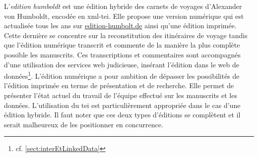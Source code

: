 \documentclass[a4paper, 12pt, twoside]{book}
\begin{document}
L'\textit{edition humboldt} est une édition hybride des carnets de voyages d'Alexander von Humboldt, encodée en \gls{xml}-\gls{tei}. Elle propose une version numérique qui est actualisée tous les ans sur \href{https://edition-humboldt.de/}{edition-humbolt.de} ainsi qu'une édition imprimée. Cette dernière se concentre sur la reconstitution des itinéraires de voyage tandis que l'édition numérique transcrit et commente de la manière la plus complète possible les manuscrits. Ces transcriptions et commentaires sont accompagnés d'une utilisation des services web judicieuse, insérant l'édition dans le web de données\footnote{cf. \autoref{sect:interEtLinkedData}}. L'édition numérique a pour ambition de dépasser les possibilités de l'édition imprimée en terme de présentation et de recherche. Elle permet de présenter l'état actuel du travail de l'équipe effectué sur les manuscrits et les données. L'utilisation du \gls{tei} est particulièrement appropriée dans le cas d'une édition hybride. Il faut noter que ces deux types d'éditions se complètent et il serait malheureux de les positionner en concurrence. 
\end{document}
